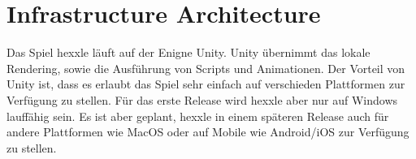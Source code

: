 \documentclass[../main.tex]{subfiles}
\begin{document}
    
    \section{Infrastructure Architecture}

    \par Das Spiel \gls{hexxle} läuft auf der Enigne Unity. Unity übernimmt das lokale Rendering, sowie die Ausführung von Scripts und Animationen. Der Vorteil von Unity ist, dass es erlaubt das Spiel sehr einfach auf verschieden Plattformen zur Verfügung zu stellen. Für das erste Release wird \gls{hexxle} aber nur auf Windows lauffähig sein. Es ist aber geplant, \gls{hexxle} in einem späteren Release auch für andere Plattformen wie MacOS oder auf Mobile wie Android/iOS zur Verfügung zu stellen.      
\end{document}
